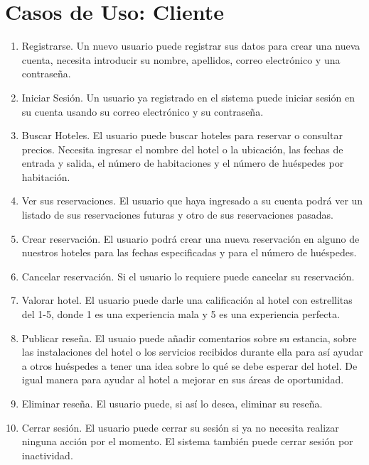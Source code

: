\section{\bfseries\LARGE Casos de Uso: Cliente}

\begin{enumerate}
    \item Registrarse. Un nuevo usuario puede registrar sus datos para crear una nueva cuenta, necesita introducir su nombre, apellidos, correo electrónico y una contraseña.
    \item Iniciar Sesión. Un usuario ya registrado en el sistema puede iniciar sesión en su cuenta usando su correo electrónico y su contraseña.
    \item Buscar Hoteles. El usuario puede buscar hoteles para reservar o consultar precios. Necesita ingresar el nombre del hotel o la ubicación, las fechas de entrada y salida, el número de habitaciones y el número de huéspedes por habitación.
    \item Ver sus reservaciones. El usuario que haya ingresado a su cuenta podrá ver un listado de sus reservaciones futuras y otro de sus reservaciones pasadas.
    \item Crear reservación. El usuario podrá crear una nueva reservación en alguno de nuestros hoteles para las fechas especificadas y para el número de huéspedes. 
    \item Cancelar reservación. Si el usuario lo requiere puede cancelar su reservación.
    \item Valorar hotel. El usuario puede darle una calificación al hotel con estrellitas del 1-5, donde 1 es una experiencia mala y 5 es una experiencia perfecta.
    \item Publicar reseña. El usuaio puede añadir comentarios sobre su estancia, sobre las instalaciones del hotel o los servicios recibidos durante ella para así ayudar a otros huéspedes a tener una idea sobre lo qué se debe esperar del hotel. De igual manera para ayudar al hotel a mejorar en sus áreas de oportunidad.
    \item Eliminar reseña. El usuario puede, si así lo desea, eliminar su reseña.
    \item Cerrar sesión. El usuario puede cerrar su sesión si ya no necesita realizar ninguna acción por el momento. El sistema también puede cerrar sesión por inactividad.
\end{enumerate}


